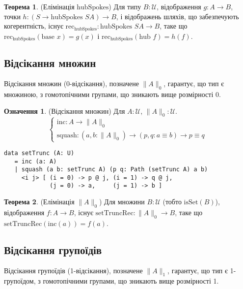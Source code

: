 \documentclass{article}
\theoremstyle{definition}
\newtheorem{theorem}{Теорема}
\newtheorem{definition}{Означення}
\begin{document}
\begin{theorem} (Елімінація \( \text{hubSpokes} \))
Для типу \( B : \mathcal{U} \), відображення \( g : A \to B \),
точки \( h : (S \to \text{hubSpokes } S A) \to B \),
і відображень шляхів, що забезпечують когерентність, існує
\( \text{rec}_{\text{hubSpokes}} : \text{hubSpokes } S A \to B \),
таке що \( \text{rec}_{\text{hubSpokes}}(\text{base } x) = g(x) \)
і \( \text{rec}_{\text{hubSpokes}}(\text{hub } f) = h(f) \).
\end{theorem}

\subsection{Відсікання множин}
Відсікання множин (0-відсікання), позначене \( \| A \|_0 \),
гарантує, що тип є множиною, з гомотопічними групами, що зникають вище розмірності 0.

\begin{definition} (Відсікання множин)
Для \( A : \mathcal{U} \), \( \| A \|_0 : \mathcal{U} \).
\[
\begin{cases}
\text{inc} : A \to \| A \|_0 \\
\text{squash} : (a, b : \| A \|_0) \to (p, q : a \equiv b) \to p \equiv q
\end{cases}
\]
\begin{lstlisting}
data setTrunc (A: U)
   = inc (a: A)
   | squash (a b: setTrunc A) (p q: Path (setTrunc A) a b)
     <i j> [ (i = 0) -> p @ j, (i = 1) -> q @ j,
             (j = 0) -> a,     (j = 1) -> b ]
\end{lstlisting}
\end{definition}

\begin{theorem} (Елімінація \( \| A \|_0 \))
Для множини \( B : \mathcal{U} \) (тобто \( \text{isSet}(B) \)), відображення \( f : A \to B \),
існує \( \text{setTruncRec} : \| A \|_0 \to B \), таке що \( \text{setTruncRec}(\text{inc}(a)) = f(a) \).
\end{theorem}

\subsection{Відсікання групоїдів}
Відсікання групоїдів (1-відсікання), позначене \( \| A \|_1 \), гарантує, що
тип є 1-групоїдом, з гомотопічними групами, що зникають вище розмірності 1.
\end{document}
